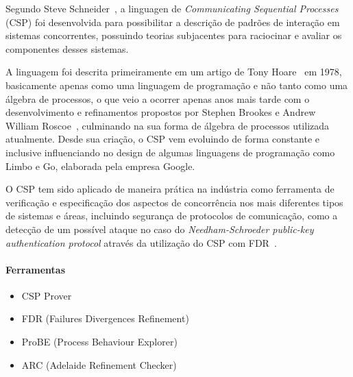Segundo Steve Schneider~\cite{Schneider:1999:CRT:555233}, a linguagen de \textit{Communicating Sequential Processes}
(CSP) foi desenvolvida para possibilitar a descrição de padrões de interação em sistemas concorrentes,
possuindo teorias subjacentes para raciocinar e avaliar os componentes desses sistemas.

A linguagem foi descrita primeiramente em um artigo de Tony Hoare~\cite{Hoare:1978:CSP:359576.359585} em 1978,
basicamente apenas como uma linguagem de programação e não tanto como uma álgebra de processos, o que veio a ocorrer
apenas anos mais tarde com o desenvolvimento e refinamentos propostos por Stephen Brookes e Andrew William Roscoe~\cite{Brookes:1984:TCS:828.833},
culminando na sua forma de álgebra de processos utilizada atualmente.
Desde sua criação, o CSP vem evoluindo de forma constante e inclusive influenciando no design de algumas linguagens
de programação como Limbo e Go, elaborada pela empresa Google.

O CSP tem sido aplicado de maneira prática na indústria como ferramenta de verificação e especificação dos aspectos
de concorrência nos mais diferentes tipos de sistemas e áreas, incluindo segurança de protocolos de comunicação,
como a detecção de um possível ataque no caso do \textit{Needham-Schroeder public-key authentication protocol}
através da utilização do CSP com FDR~\cite{Lowe:1996:BFN:646480.693776}.

\paragraph{Ferramentas}

\begin{itemize}
\item{CSP Prover}
\item{FDR (Failures Divergences Refinement)}
\item{ProBE (Process Behaviour Explorer)}
\item{ARC (Adelaide Refinement Checker)}
\end{itemize}
